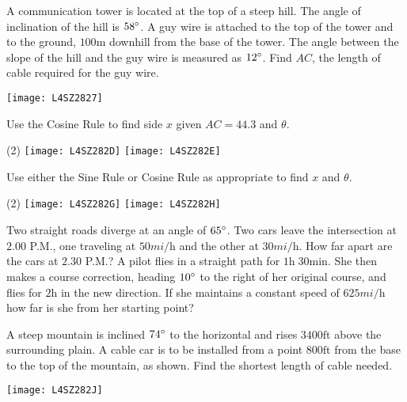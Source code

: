 \begin{Exercise}[title={Applications},label=exApplications]
\begin{multicols}{2}
	\Question A communication tower is located at the top of a steep hill. The angle of inclination
	of the hill is $58 \mbox{{\ensuremath{{}^\circ}}}$. A guy wire is attached to the top of the tower and to the ground, $100 \mbox{m}$ downhill from the base of the tower. The angle between the slope of the hill and the guy wire is measured as $12 \mbox{{\ensuremath{{}^\circ}}}$. Find $A C$, the length of cable required for the guy wire. %
	\columnbreak 
	
	\texttt{[image: L4SZ2827]}	\\
\end{multicols}	
	\clearpage\Question Use the Cosine Rule to find side $x$ given $AC=44.3$ and $\theta$. 
\begin{tasks}(2)
	\task 	\texttt{[image: L4SZ282D]}%
	\task 	\texttt{[image: L4SZ282E]}%
\end{tasks}
\Question Use either the Sine Rule or Cosine Rule as appropriate to find $x$ and $\theta$.
	\begin{tasks}(2)
		\task 	\texttt{[image: L4SZ282G]}%
		\task 	\texttt{[image: L4SZ282H]}%
	\end{tasks}
\Question Two straight roads diverge at an angle of $65 \mbox{{\ensuremath{{}^\circ}}}$. Two cars leave the intersection at $2.00$ P.M., one traveling at $50 mi/\mbox{h}$ and the other at $30 mi/\mbox{h}$. How far apart are the cars at $2.30$ P.M.?%
\Question A pilot flies in a straight path for $1 \mbox{h}\; 30 \mbox{min}$. She then makes a course correction, heading $10 \mbox{{\ensuremath{{}^\circ}}}$ to the right of her original course, and flies for $2 \mbox{h}$ in the new direction. If she maintains a constant speed of $625 mi/\mbox{h}$ how far is she from her starting point?%

\begin{multicols}{2}
	\Question A steep mountain is inclined $74 \mbox{{\ensuremath{{}^\circ}}}$ to the horizontal and rises $3400 \mbox{ft}$ above the surrounding plain. A cable car is to be installed from a point $800 \mbox{ft}$ from the base to the top of the mountain, as shown. Find the shortest length of cable needed.%
	\columnbreak 
	
	\texttt{[image: L4SZ282J]}	\\
\end{multicols}	


\end{Exercise}

